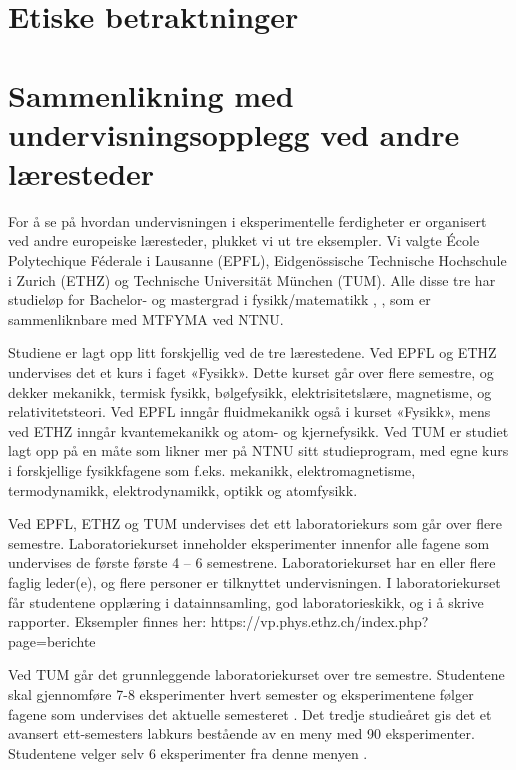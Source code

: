 \documentclass{article}
\begin{document}
\section{Etiske betraktninger}


\section{Sammenlikning med undervisningsopplegg ved andre læresteder}

For å se på hvordan undervisningen i eksperimentelle ferdigheter er organisert ved andre europeiske læresteder, plukket vi ut tre eksempler. Vi valgte École Polytechique Féderale i Lausanne (EPFL), Eidgenössische Technische Hochschule i Zurich (ETHZ) og Technische Universität München (TUM). Alle disse tre har studieløp for Bachelor- og mastergrad i fysikk/matematikk \cite{ETHZprog}, \cite{EPFLprog}, \cite{TUMprog} som er sammenliknbare med MTFYMA ved NTNU. 

Studiene er lagt opp litt forskjellig ved de tre lærestedene. Ved EPFL og ETHZ undervises det et kurs i faget «Fysikk». Dette kurset går over flere semestre, og dekker mekanikk, termisk fysikk, bølgefysikk, elektrisitetslære, magnetisme, og relativitetsteori. Ved EPFL inngår fluidmekanikk også i kurset «Fysikk», mens ved ETHZ inngår kvantemekanikk og atom- og kjernefysikk. Ved TUM er studiet lagt opp på en måte som likner mer på NTNU sitt studieprogram, med egne kurs i forskjellige fysikkfagene som f.eks. mekanikk, elektromagnetisme, termodynamikk, elektrodynamikk, optikk og atomfysikk. 

Ved EPFL, ETHZ og TUM undervises det ett laboratoriekurs som går over flere semestre. Laboratoriekurset inneholder eksperimenter innenfor alle fagene som undervises de første første 4 – 6 semestrene. Laboratoriekurset har en eller flere faglig leder(e), og flere personer er tilknyttet undervisningen. I laboratoriekurset får studentene opplæring i datainnsamling, god laboratorieskikk, og i å skrive rapporter. Eksempler finnes her: https://vp.phys.ethz.ch/index.php?page=berichte

Ved TUM går det grunnleggende laboratoriekurset over tre semestre. Studentene skal gjennomføre 7-8 eksperimenter hvert semester og eksperimentene følger fagene som undervises det aktuelle semesteret \cite{TUMpraktikum1}. Det tredje studieåret gis det et avansert ett-semesters labkurs bestående av en meny med 90 eksperimenter. Studentene velger selv 6 eksperimenter fra denne menyen \cite{TUMpraktikum2}. 
\end{document}
